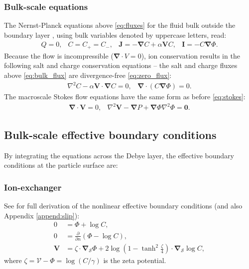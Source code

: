 \documentclass[MSc,beforeExam]{iitcsthesis}
\newcommand{\deriv}[2]{\frac{\partial #1}{\partial #2}}
\newcommand{\pars}[1]{\left(#1\right)}
\newcommand\Laplacian{\nabla^2}
\newcommand\bnabla{\boldsymbol{\nabla}}
\newcommand\bV{\boldsymbol{V}}
\newcommand\bI{\boldsymbol{I}}
\newcommand\bJ{\boldsymbol{J}}
\newcommand\bzero{\boldsymbol{0}}
\newcommand\cV{\mathscr{V}}
\begin{document}
\subsubsection  {Bulk-scale equations}
The Nernst-Planck equations above \eqref{eq:fluxes} for the fluid bulk outside
the boundary layer \cite{yariv2010asymptotic}, 
using bulk variables denoted by uppercase letters, read:
\begin{equation} \begin{array}{cccc} \label{eq:bulk_flux}
  Q = 0, &
  C = C_+ = C_-, &
\bJ = -\bnabla C + \alpha \bV C, &
\bI = -C \bnabla \varPhi.
\end{array}\end{equation}
Because the flow is incompressible ($\bnabla \cdot V = 0$), 
ion conservation results in the following 
salt and charge conservation equations -- the salt and charge fluxes above 
\eqref{eq:bulk_flux} are divergence-free
\eqref{eq:zero_flux}:
\begin{equation} \begin{array}{ccc}
\label{eq:salt_charge}
\Laplacian C - \alpha \bV \cdot \bnabla C = 0, &
\bnabla \cdot \pars{ C \bnabla \varPhi } = 0.
\end{array}\end{equation}
The macroscale Stokes flow equations have the same form as before \eqref{eq:stokes}:
\begin{equation}
\begin{array}{ccc}
\bnabla \cdot \bV = 0, &   
\Laplacian \bV - \bnabla P + \bnabla \varPhi \Laplacian \varPhi = \bzero.
\end{array}
\end{equation}

\subsection{Bulk-scale effective boundary conditions}
By integrating the equations across the Debye layer,
the effective boundary conditions at the particle surface are:
\subsubsection{Ion-exchanger} See \cite{yariv2010migration} for full derivation
of the nonlinear effective boundary conditions (and also Appendix \ref{append:slip}):
\begin{align}
\label{eq:ionex_bnd}
\nonumber 
0 &= \varPhi + \log C, \\
0 &= \deriv{}{n} \pars{\varPhi - \log C}, \\
\nonumber \bV &= 
\zeta \cdot \bnabla_\mathcal{S} \varPhi 
+ 2\log\pars{1-\tanh^2\frac{\zeta}{4}} \cdot \bnabla_\mathcal{S} \log C,
\end{align}
where $\zeta = \cV - \varPhi = \log (C / \gamma)$ 
is the zeta potential.
\end{document}
